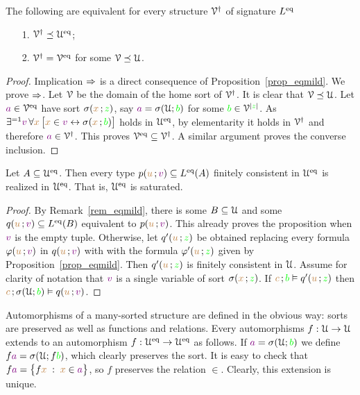\documentclass[creche.tex]{subfiles}
\begin{document}
\begin{proposition}
The following are equivalent for every structure $\EuScript V^\dag$ of signature $L^{{\rm eq}}$
\begin{itemize}
\item[1.] $\EuScript V^\dag\preceq\EuScript U^{{\rm eq}}$;
\item[2.] $\EuScript V^\dag=\EuScript V^{{\rm eq}}$ for some $\EuScript V\preceq\EuScript U$.
\end{itemize}
\end{proposition}
\begin{proof}
Implication $\Rightarrow$ is a direct consequence of Proposition~\ref{prop_eqmild}. We prove $\Rightarrow$. Let $\EuScript V$ be the domain of the home sort of $\EuScript V^\dag$. It is clear that $\EuScript V\preceq\EuScript U$. Let ${\color{violet} a}\in\EuScript V^{{\rm eq}}$  have sort $\sigma({\color{brown} x}\,;{\color{green} z})$, say ${\color{violet} a}=\sigma(\EuScript U;{\color{green} b})$ for some ${\color{green} b}\in\EuScript V^{|{\color{green} z}|}$. As $\exists^{=1}{\color{violet} v}\, \forall{\color{brown}x}\,\big[{\color{brown} x}\in{\color{violet}v}\leftrightarrow\sigma({\color{brown} x}\,;{\color{green} b})\big]$ holds in $\EuScript U^{{\rm eq}}$, by elementarity it holds in $\EuScript V^\dag$ and therefore ${\color{violet} a}\in\EuScript V^\dag$. This proves $\EuScript V^{{\rm eq}}\subseteq\EuScript V^\dag$. A similar argument proves the converse inclusion.
\end{proof}

\begin{proposition}\label{prop_Ueq_saturated}
Let $A\subseteq\EuScript U^{{\rm eq}}$. Then every type $p({\color{brown} u}\,;{\color{violet} v})\subseteq L^{{\rm eq}}(A)$ finitely consistent in $\EuScript U^{{\rm eq}}$ is realized in $\EuScript U^{{\rm eq}}$. That is, $\EuScript U^{{\rm eq}}$ is saturated.
\end{proposition}
\begin{proof}
By Remark~\ref{rem_eqmild}, there is some $B\subseteq\EuScript U$ and some $q({\color{brown} u}\,;{\color{violet} v})\subseteq L^{{\rm eq}}(B)$ equivalent to $p({\color{brown} u}\,;{\color{violet} v})$. This already proves the proposition when ${\color{violet} v}$ is the empty tuple. Otherwise, let $q'({\color{brown} u}\,;{\color{green} z})$ be obtained replacing every formula $\varphi({\color{brown} u}\,;{\color{violet} v})$ in $q({\color{brown} u}\,;{\color{violet} v})$ with with the formula $\varphi'({\color{brown} u}\,;{\color{green} z})$ given by Proposition~\ref{prop_eqmild}. Then $q'({\color{brown} u}\,;{\color{green} z})$ is finitely consistent in $\EuScript U$. Assume for clarity of notation that ${\color{violet} v}$ is a single variable of sort  $\sigma({\color{brown} x}\,;{\color{green} z})$. If ${\color{brown} c}\,;{\color{green} b}\vDash q'({\color{brown} u}\,;{\color{green} z})$ then  ${\color{brown} c}\,;\sigma(\EuScript U;{\color{green} b})\vDash q({\color{brown} u}\,;{\color{violet} v})$.
\end{proof}


Automorphisms of a many-sorted structure are defined in the obvious way: sorts are preserved as well as functions and relations. Every automorphisms $f:\EuScript U\rightarrow\EuScript U$ extends to an automorphism $f:\EuScript U^{{\rm eq}}\rightarrow\EuScript U^{{\rm eq}}$ as follows.  If ${\color{violet} a}=\sigma(\EuScript U;{\color{green} b})$ we define $f{\color{violet} a}=\sigma(\EuScript U;f{\color{green} b})$, which clearly preserves the sort. It is easy to check that $f{\color{violet} a}=\big\{f{\color{brown} x}\;:\;{\color{brown} x}\in {\color{violet}a}\big\}$, so $f$ preserves the relation $\in$. Clearly, this extension is unique.
\end{document}
